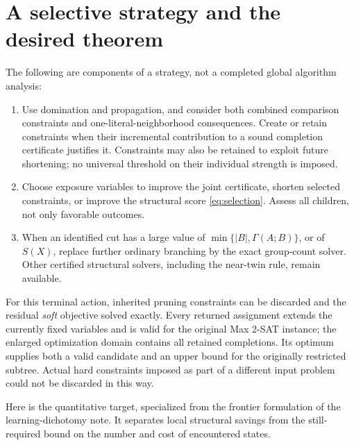 \documentclass[11pt,a4paper]{article}
\theoremstyle{definition}
\begin{document}
\section{A selective strategy and the desired theorem}\label{sec:target}

The following are components of a strategy, not a completed global
algorithm analysis:
\begin{enumerate}
\item Use domination and propagation, and consider both combined
comparison constraints and one-literal-neighborhood consequences.
Create or retain constraints when their incremental contribution to a
sound completion certificate justifies it. Constraints may also be
retained to exploit future shortening; no universal threshold on their
individual strength is imposed.
\item Choose exposure variables to improve the joint certificate,
shorten selected constraints, or improve the structural score
\eqref{eq:selection}. Assess all children, not only favorable outcomes.
\item When an identified cut has a large value of
$\min\{|B|,\Gamma(A;B)\}$, or of $S(X)$, replace further ordinary
branching by the exact group-count solver. Other certified structural
solvers, including the near-twin rule, remain available.
\end{enumerate}

For this terminal action, inherited pruning constraints can be discarded
and the residual \emph{soft} objective solved exactly. Every returned
assignment extends the currently fixed variables and is valid for the
original Max 2-SAT instance; the enlarged optimization domain contains
all retained completions. Its optimum supplies both a valid candidate
and an upper bound for the originally restricted subtree. Actual hard
constraints imposed as part of a different input problem could not be
discarded in this way.

Here is the quantitative target, specialized from the frontier formulation
of the learning-dichotomy note. It separates local structural savings from
the still-required bound on the number and cost of encountered states.
\end{document}
